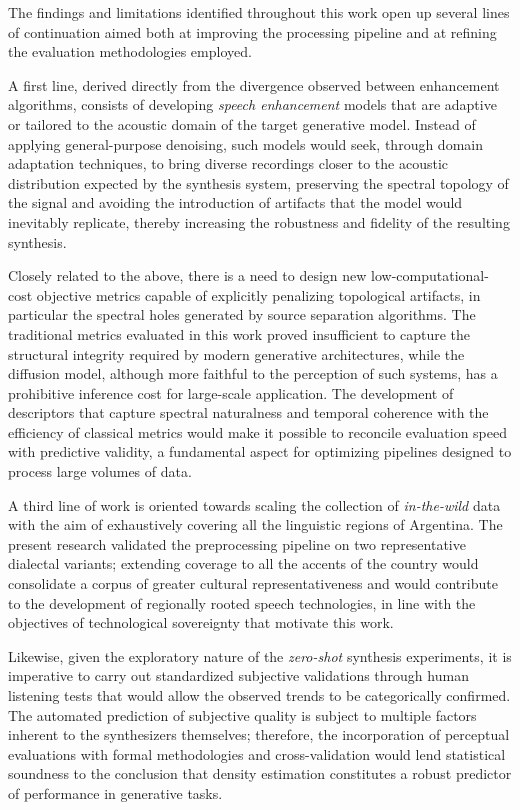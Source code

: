 The findings and limitations identified throughout this work open up several lines of continuation aimed both at improving the processing pipeline and at refining the evaluation methodologies employed.

A first line, derived directly from the divergence observed between enhancement algorithms, consists of developing \textit{speech enhancement} models that are adaptive or tailored to the acoustic domain of the target generative model. Instead of applying general-purpose denoising, such models would seek, through domain adaptation techniques, to bring diverse recordings closer to the acoustic distribution expected by the synthesis system, preserving the spectral topology of the signal and avoiding the introduction of artifacts that the model would inevitably replicate, thereby increasing the robustness and fidelity of the resulting synthesis.

Closely related to the above, there is a need to design new low-computational-cost objective metrics capable of explicitly penalizing topological artifacts, in particular the spectral holes generated by source separation algorithms. The traditional metrics evaluated in this work proved insufficient to capture the structural integrity required by modern generative architectures, while the diffusion model, although more faithful to the perception of such systems, has a prohibitive inference cost for large-scale application. The development of descriptors that capture spectral naturalness and temporal coherence with the efficiency of classical metrics would make it possible to reconcile evaluation speed with predictive validity, a fundamental aspect for optimizing pipelines designed to process large volumes of data.

A third line of work is oriented towards scaling the collection of \textit{in-the-wild} data with the aim of exhaustively covering all the linguistic regions of Argentina. The present research validated the preprocessing pipeline on two representative dialectal variants; extending coverage to all the accents of the country would consolidate a corpus of greater cultural representativeness and would contribute to the development of regionally rooted speech technologies, in line with the objectives of technological sovereignty that motivate this work.

Likewise, given the exploratory nature of the \textit{zero-shot} synthesis experiments, it is imperative to carry out standardized subjective validations through human listening tests that would allow the observed trends to be categorically confirmed. The automated prediction of subjective quality is subject to multiple factors inherent to the synthesizers themselves; therefore, the incorporation of perceptual evaluations with formal methodologies and cross-validation would lend statistical soundness to the conclusion that density estimation constitutes a robust predictor of performance in generative tasks.

